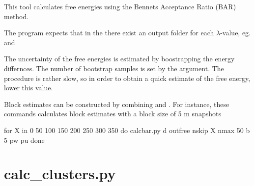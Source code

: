 \documentclass[letterpaper,10pt,english]{sphinxmanual}
\begin{document}

This tool calculates free energies using the Bennets Acceptance Ratio (BAR) method.

The program expects that in the  there exist an output folder for each \(\lambda\)-value, eg.  and 

The uncertainty of the free energies is estimated by boostrapping the energy differnces. The number of bootstrap samples is set by the  argument. The procedure is rather slow, so in order to obtain a quick estimate of the free energy, lower this value.

Block estimates can be constructed by combining  and . For instance, these commands calculates block estimates with a block size of 5 m snapshots

%
\begin{sphinxVerbatim}[commandchars=\\\{\}]
for X in 0 50 100 150 200 250 300 350
do
calc\PYGZus{}bar.py \PYGZhy{}d out\PYGZus{}free \PYGZhy{}nskip \PYGZdl{}X \PYGZhy{}nmax 50 \PYGZhy{}b 5 \PYGZhy{}pw \PYGZhy{}pu
done
\end{sphinxVerbatim}


\section{calc\_clusters.py}
\label{\detokenize{tools:calc-clusters-py}}

%
\begin{sphinxVerbatim}[commandchars=\\\{\}]
  
   
    
    
\end{sphinxVerbatim}
\end{document}
